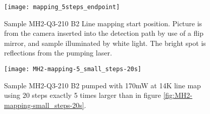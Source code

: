 \begin{figure}[H]
\centering
\texttt{[image: mapping\_5steps\_endpoint]}
\caption[MH2-Q3-210 line mapping start position]{Sample MH2-Q3-210 B2 Line mapping start position. Picture is from the camera inserted into the detection path by use of a flip mirror, and sample illuminated by white light. The bright spot is reflections from the pumping laser.}
\label{fig:mapping_5steps_endpoint}%
\end{figure}

\begin{figure}[H]
\centering
\texttt{[image: MH2-mapping-5\_small\_steps-20s]}
\caption[MH2-Q3-210 line mapping]{Sample MH2-Q3-210 B2 pumped with 170mW at 14K line map using 20 steps exactly 5 times larger than in figure \ref{fig:MH2-mapping-small_steps-20s}.}
\label{fig:MH2-mapping-5_small_steps-20s}%
\end{figure}


